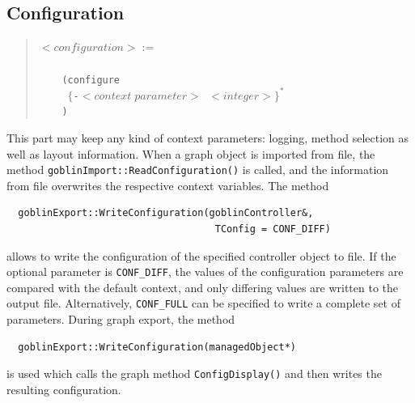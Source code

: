 \documentclass[a4paper,11pt,twoside]{book}
\begin{document}
\begin{multicols}{2}
\subsection{Configuration}
\label{slb_config}
\begin{quote}
$<configuration> :=$\verb/    /\\
\verb/    /\\
\verb/    (configure/\\
\verb/     /$\{$\verb/-/$<context\;parameter>$\verb/ /$<integer>\}^*$\verb//\\
\verb/    )/\\
\end{quote}
This part may keep any kind of context parameters: logging, method selection
as well as layout information. When a graph object is imported from file, the
method \verb/goblinImport::ReadConfiguration()/ is called, and the information
from file overwrites the respective context variables. The method
\begin{verbatim}
  goblinExport::WriteConfiguration(goblinController&,
                                    TConfig = CONF_DIFF)
\end{verbatim}
allows to write the configuration of the specified controller object to file.
If the optional parameter is \verb/CONF_DIFF/, the values of the configuration
parameters are compared with the default context, and only differing values are
written to the output file. Alternatively, \verb/CONF_FULL/ can be specified to
write a complete set of parameters. During graph export, the method
\begin{verbatim}
  goblinExport::WriteConfiguration(managedObject*)
\end{verbatim}
is used which calls the graph method \verb/ConfigDisplay()/ and then writes
the resulting configuration.




\end{multicols}
\end{document}
